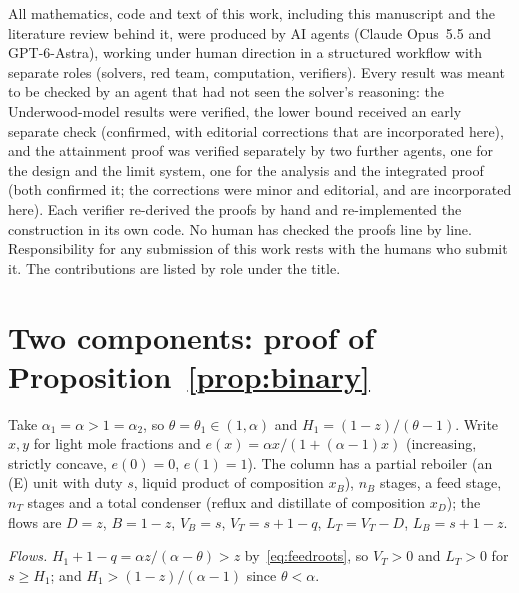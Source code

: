 \documentclass[11pt,a4paper]{report}
\begin{document}
All mathematics, code and text of this work, including this manuscript and the literature review behind it, were produced
by AI agents (Claude Opus~5.5 and GPT-6-Astra), working under human direction in a structured workflow with separate
roles (solvers, red team, computation, verifiers). Every result was meant to be checked by an agent that had
not seen the solver's reasoning: the Underwood-model results were verified, the lower bound received an early
separate check (confirmed, with editorial corrections that are incorporated here), and the attainment proof was verified
separately by two further agents, one for the design and the limit system, one for the analysis and the integrated
proof (both confirmed it; the corrections were minor and editorial, and are incorporated here). Each verifier re-derived
the proofs by hand and re-implemented the construction in its own code. No human has checked the proofs line by line. Responsibility for any
submission of this work rests with the humans who submit it. The contributions are listed by role under the title.

\appendix
\renewcommand*{\thesection}{\Alph{section}}
\setcounter{section}{0}

\section{Two components: proof of Proposition~\ref{prop:binary}}\label{app:binary}

Take \(\alpha_1=\alpha>1=\alpha_2\), so \(\theta=\theta_1\in(1,\alpha)\) and \(H_1=(1-z)/(\theta-1)\). Write \(x,y\) for light mole
fractions and \(e(x)=\alpha x/(1+(\alpha-1)x)\) (increasing, strictly concave, \(e(0)=0\), \(e(1)=1\)). The column has a partial
reboiler (an (E) unit with duty \(s\), liquid product of composition \(x_B\)), \(n_B\) stages, a feed stage, \(n_T\) stages and a total
condenser (reflux and distillate of composition \(x_D\)); the flows are \(D=z\), \(B=1-z\), \(V_B=s\), \(V_T=s+1-q\),
\(L_T=V_T-D\), \(L_B=s+1-z\).

\emph{Flows.} \(H_1+1-q=\alpha z/(\alpha-\theta)>z\) by~\eqref{eq:feedroots}, so \(V_T>0\) and \(L_T>0\) for \(s\ge H_1\); and
\(H_1>(1-z)/(\alpha-1)\) since \(\theta<\alpha\).
\end{document}
